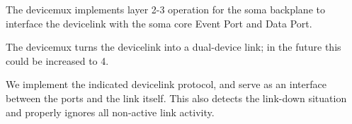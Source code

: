 The devicemux implements layer 2-3 operation for the soma backplane to
interface the devicelink with the soma core Event Port and Data Port. 

The devicemux turns the devicelink into a dual-device link; in the
future this could be increased to 4.

We implement the indicated devicelink protocol, and serve as an
interface between the ports and the link itself. This also detects the
link-down situation and properly ignores all non-active link activity.


